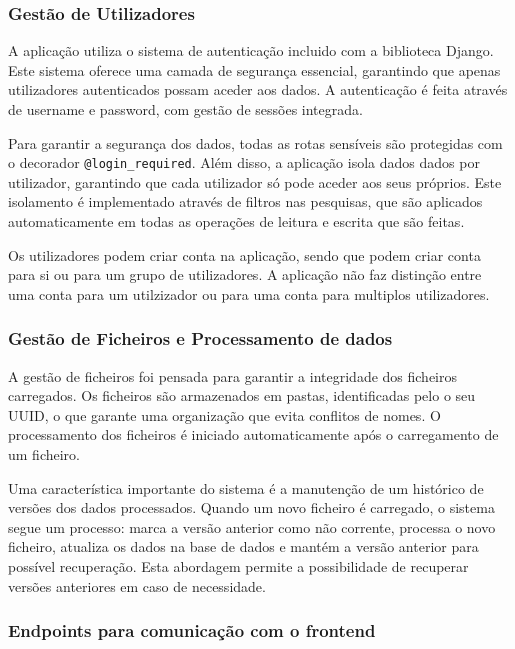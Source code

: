 \subsubsection{Gestão de Utilizadores}

A aplicação utiliza o sistema de autenticação incluido com a biblioteca Django. Este sistema oferece uma camada de segurança essencial, garantindo que apenas utilizadores autenticados possam aceder aos dados. A autenticação é feita através de username e password, com gestão de sessões integrada.

Para garantir a segurança dos dados, todas as rotas sensíveis são protegidas com o decorador \texttt{@login\_required}. Além disso, a aplicação isola dados dados por utilizador, garantindo que cada utilizador só pode aceder aos seus próprios. Este isolamento é implementado através de filtros nas pesquisas, que são aplicados automaticamente em todas as operações de leitura e escrita que são feitas.

Os utilizadores podem criar conta na aplicação, sendo que podem criar conta para si ou para um grupo de utilizadores. A aplicação não faz distinção entre uma conta para um utilzizador ou para uma conta para multiplos utilizadores.

\subsubsection{Gestão de Ficheiros e Processamento de dados}

A gestão de ficheiros foi pensada para garantir a integridade dos ficheiros carregados. Os ficheiros são armazenados em pastas, identificadas pelo o seu UUID, o que garante uma organização que evita conflitos de nomes. O processamento dos ficheiros é iniciado automaticamente após o carregamento de um ficheiro.

Uma característica importante do sistema é a manutenção de um histórico de versões dos dados processados. Quando um novo ficheiro é carregado, o sistema segue um processo: marca a versão anterior como não corrente, processa o novo ficheiro, atualiza os dados na base de dados e mantém a versão anterior para possível recuperação. Esta abordagem permite a possibilidade de recuperar versões anteriores em caso de necessidade.

\subsubsection{Endpoints para comunicação com o frontend}

